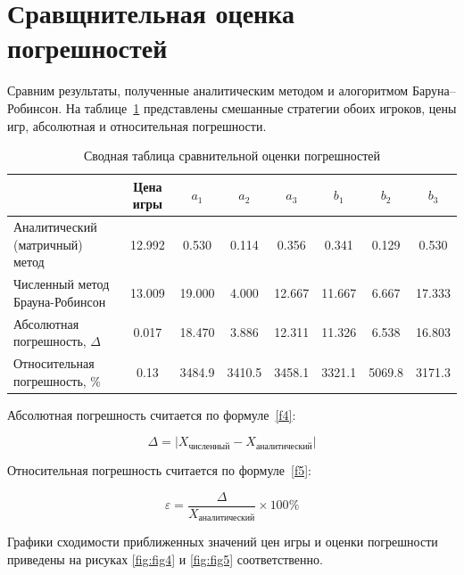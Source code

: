 \section{Сравщнительная оценка погрешностей}

Сравним результаты, полученные аналитическим методом и алогоритмом Баруна--Робинсон.
На таблице~\ref{tab:tab2} представлены смешанные стратегии обоих игроков, цены игр,
абсолютная и относительная погрешности.

\begin{table}[h]
    \centering
    \caption{Сводная таблица сравнительной оценки погрешностей}
    \begin{tabularx}{\textwidth}{|X|c|c|c|c|c|c|c|} \hline
        & Цена игры & $a_1$ & $a_2$ & $a_3$ & $b_1$ & $b_2$ & $b_3$ \\ \hline
        Аналитический (матричный) метод & 12.992 & 0.530 & 0.114 & 0.356 & 0.341 & 0.129 & 0.530 \\ \hline
        Численный метод Брауна-Робинсон & 13.009 & 19.000 & 4.000 & 12.667 & 11.667 & 6.667 & 17.333 \\ \hline
        Абсолютная погрешность, $\Delta$ & 0.017 & 18.470 & 3.886 & 12.311 & 11.326 & 6.538 & 16.803 \\ \hline
        Относительная погрешность, \% & 0.13 & 3484.9 & 3410.5 & 3458.1 & 3321.1 & 5069.8 & 3171.3 \\ \hline
    \end{tabularx}
    \label{tab:tab2}
\end{table}

Абсолютная погрешность считается по формуле~\ref{f4}:

\begin{equation}\label{f4}
  \Delta = \left| X_{\text{численный}} - X_{\text{аналитический}} \right|
\end{equation}

Относительная погрешность считается по формуле~\ref{f5}:

\begin{equation}\label{f5}
\varepsilon = \frac{\Delta}{X_{\text{аналитический}}} \times 100\%
\end{equation}

Графики сходимости приближенных значений цен игры и оценки погрешности приведены на рисуках \ref{fig:fig4} и \ref{fig:fig5} соответственно.

